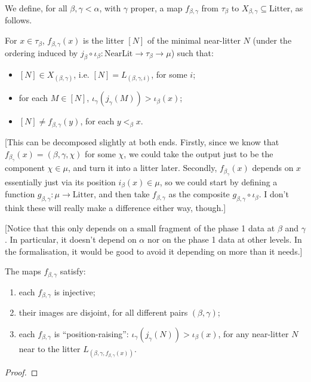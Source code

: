 \begin{definition}
\label {def:f-map}
\leanok
We define, for all $\beta,\gamma < \alpha$, with $\gamma$ proper, a map $f_{\beta,\gamma}$ from $\tau_\beta$ to $X_{\beta,\gamma} \subseteq \mathrm{Litter}$, as follows.

For $x \in \tau_\beta$, $f_{\beta,\gamma}(x)$ is the litter $[N]$ of the minimal near-litter $N$ (under the ordering induced by $j_\beta \circ \iota_\beta : \mathrm{NearLit} \to \tau_\beta \to \mu$) such that:
\begin{itemize}
  \item $[N]\in X_{(\beta,\gamma)}$, i.e. $[N] = L_{(\beta,\gamma,i)}$, for some $i$;
  \item for each $M \in [N]$, $\iota_\gamma(j_\gamma(M)) >\iota_\beta(x)$;
  \item $[N] \neq f_{\beta,\gamma}(y)$, for each $y <_\beta x$.
\end{itemize}

[This can be decomposed slightly at both ends.  Firstly, since we know that $f_{\beta_\gamma}(x) = (\beta,\gamma,\chi)$ for some $\chi$, we could take the output just to be the component $\chi \in \mu$, and turn it into a litter later.  Secondly, $f_{\beta_\gamma}(x)$ depends on $x$ essentially just via its position $i_\beta(x) \in \mu$, so we could start by defining a function $g_{\beta,\gamma} : \mu \to \mathrm{Litter}$, and then take $f_{\beta,\gamma}$ as the composite $g_{\beta,\gamma} \circ \iota_\beta$.  I don’t think these will really make a difference either way, though.]

[Notice that this only depends on a small fragment of the phase 1 data at $\beta$ and $\gamma$. In particular, it doesn’t depend on $\alpha$ nor on the phase 1 data at other levels. In the formalisation, it would be good to avoid it depending on more than it needs.]
\end{definition}

\begin{lemma}
  \label{lem:f-map-properties}
  \leanok
  The maps $f_{\beta,\gamma}$ satisfy:
  \begin{enumerate}
  \item each $f_{\beta,\gamma}$ is injective;
  \item their images are disjoint, for all different pairs $(\beta,\gamma)$;
  \item each $f_{\beta,\gamma}$ is “position-raising”: $\iota_\gamma(j_\gamma(N)) > \iota_\beta(x)$, for any near-litter $N$ near to the litter $L_{(\beta,\gamma,f_{\beta,\gamma}(x))}$.
  \end{enumerate}
\end{lemma}
\begin{proof}\leanok\end{proof}

